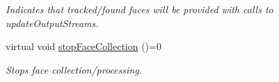 \begin{DoxyCompactItemize}
\begin{DoxyCompactList}\small\item\em Indicates that tracked/found faces will be provided with calls to update\+Output\+Streams. \end{DoxyCompactList}\item 
\hypertarget{class_output_streams_updater_stragedy_a41553b7aa7e80d91e706bf1eb8acc3df}{}virtual void \hyperlink{class_output_streams_updater_stragedy_a41553b7aa7e80d91e706bf1eb8acc3df}{stop\+Face\+Collection} ()=0\label{class_output_streams_updater_stragedy_a41553b7aa7e80d91e706bf1eb8acc3df}

\begin{DoxyCompactList}\small\item\em Stops face collection/processing. \end{DoxyCompactList}\end{DoxyCompactItemize}
